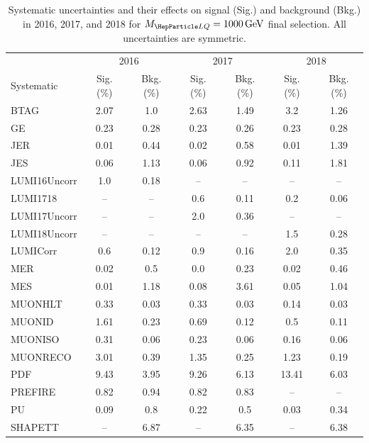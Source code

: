 \begin{table}[H]
	\begin{center}
        \begin{footnotesize}
			\caption{Systematic uncertainties and their effects on signal (Sig.) and background (Bkg.) in 2016, 2017, and 2018 for $\MLQ = \SI{1000}{GeV}$ final selection. All uncertainties are symmetric.}
			\begin{tabular}{lcccccc} \hline \hline
				& \multicolumn{2}{c}{2016} & \multicolumn{2}{c}{2017} & \multicolumn{2}{c}{2018} \\
				Systematic & Sig. (\%) & Bkg. (\%) & Sig. (\%) & Bkg. (\%) & Sig. (\%) & Bkg. (\%) \\ \hline
				BTAG &  2.07  &  1.0 &  2.63  &  1.49 &  3.2  &  1.26 \\
				GE &  0.23  &  0.28 &  0.23  &  0.26 &  0.23  &  0.28 \\
				JER &  0.01  &  0.44 &  0.02  &  0.58 &  0.01  &  1.39 \\
				JES &  0.06  &  1.13 &  0.06  &  0.92 &  0.11  &  1.81 \\
				LUMI16Uncorr &  1.0  &  0.18 & -- & -- & -- & -- \\
				LUMI1718 & -- & -- &  0.6  &  0.11 &  0.2  &  0.06 \\
				LUMI17Uncorr & -- & -- &  2.0  &  0.36 & -- & -- \\
				LUMI18Uncorr & -- & -- & -- & -- &  1.5  &  0.28 \\
				LUMICorr &  0.6  &  0.12 &  0.9  &  0.16 &  2.0  &  0.35 \\
				MER &  0.02  &  0.5 &  0.0  &  0.23 &  0.02  &  0.46 \\
				MES &  0.01  &  1.18 &  0.08  &  3.61 &  0.05  &  1.04 \\
				MUONHLT &  0.33  &  0.03 &  0.33  &  0.03 &  0.14  &  0.03 \\
				MUONID &  1.61  &  0.23 &  0.69  &  0.12 &  0.5  &  0.11 \\
				MUONISO &  0.31  &  0.06 &  0.23  &  0.06 &  0.16  &  0.06 \\
				MUONRECO &  3.01  &  0.39 &  1.35  &  0.25 &  1.23  &  0.19 \\
				PDF &  9.43  &  3.95 &  9.26  &  6.13 &  13.41  &  6.03 \\
				PREFIRE &  0.82  &  0.94 &  0.82  &  0.83 & -- & -- \\
				PU &  0.09  &  0.8 &  0.22  &  0.5 &  0.03  &  0.34 \\
				SHAPETT & -- &  6.87 & -- &  6.35 & -- &  6.38 \\

\end{tabular}
\end{footnotesize}
\end{center}
\end{table}
